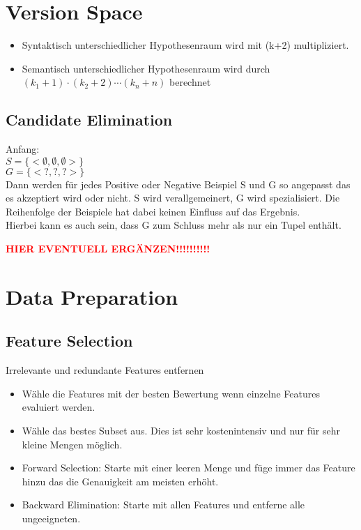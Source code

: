 \documentclass[a4paper]{scrartcl}
\begin{document}
\section{Version Space}
\begin{itemize}
\item Syntaktisch unterschiedlicher Hypothesenraum wird mit (k+2) multipliziert.
\item Semantisch unterschiedlicher Hypothesenraum wird durch $(k_1+1)\cdot(k_2+2)\cdots(k_n+n)$ berechnet
\end{itemize}

\subsection{Candidate Elimination}
Anfang:\\
$S=\{<\emptyset, \emptyset, \emptyset>\}$\\
$G=\{<?, ?,?>\}$\\
Dann werden für jedes Positive oder Negative Beispiel S und G so angepasst das es akzeptiert wird oder nicht. S wird verallgemeinert, G wird spezialisiert. Die Reihenfolge der Beispiele hat dabei keinen Einfluss auf das Ergebnis.\\
Hierbei kann es auch sein, dass G zum Schluss mehr als nur ein Tupel enthält.

\textbf{\textcolor{red}{HIER EVENTUELL ERGÄNZEN!!!!!!!!!!}}

\section{Data Preparation}
\subsection{Feature Selection}
Irrelevante und redundante Features entfernen
\begin{itemize}
\item Wähle die Features mit der besten Bewertung wenn einzelne Features evaluiert werden.
\item Wähle das bestes Subset aus. Dies ist sehr kostenintensiv und nur für sehr kleine Mengen möglich.
\item Forward Selection: Starte mit einer leeren Menge und füge immer das Feature hinzu das die Genauigkeit am meisten erhöht.
\item Backward Elimination: Starte mit allen Features und entferne alle ungeeigneten.
\end{itemize}
\end{document}
